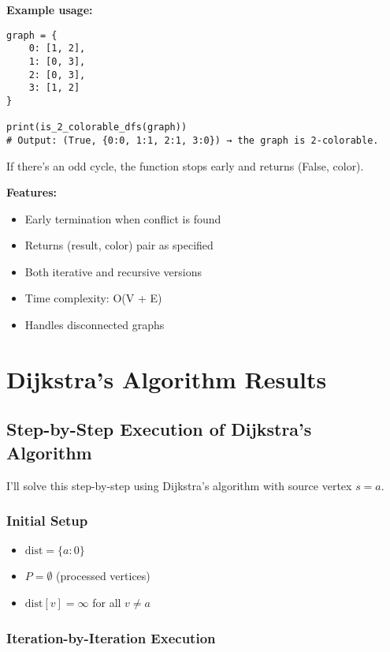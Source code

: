 \documentclass[12pt,a4paper]{article}
\begin{document}
\textbf{Example usage:}
\begin{lstlisting}[caption=Example Usage, label=lst:example_usage]
graph = {
    0: [1, 2],
    1: [0, 3],
    2: [0, 3],
    3: [1, 2]
}

print(is_2_colorable_dfs(graph))
# Output: (True, {0:0, 1:1, 2:1, 3:0}) → the graph is 2-colorable.
\end{lstlisting}

If there's an odd cycle, the function stops early and returns (False, color).

\textbf{Features:}
\begin{itemize}
\item Early termination when conflict is found
\item Returns (result, color) pair as specified
\item Both iterative and recursive versions
\item Time complexity: O(V + E)
\item Handles disconnected graphs
\end{itemize}

\section{Dijkstra's Algorithm Results}

\subsection{Step-by-Step Execution of Dijkstra's Algorithm}

I'll solve this step-by-step using Dijkstra's algorithm with source vertex $s = a$.

\subsubsection{Initial Setup}

\begin{itemize}
    \item $\text{dist} = \{a: 0\}$
    \item $P = \emptyset$ (processed vertices)
    \item $\text{dist}[v] = \infty$ for all $v \neq a$
\end{itemize}

\subsubsection{Iteration-by-Iteration Execution}
\end{document}
